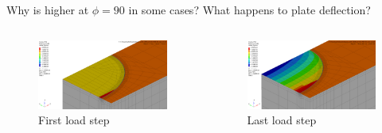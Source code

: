 \begin{frame}
Why is \J higher at \(\phi=90\) in some cases? What happens to plate deflection?
\begin{columns}
\begin{column}{0.45\textwidth}
\begin{figure}[tbp]
\centering
\includegraphics[width=\columnwidth]{step-01-zoomed}
\caption{First load step}
\end{figure}
\end{column}
\begin{column}{0.45\textwidth}
\begin{figure}[tbp]
\centering
\includegraphics[width=\columnwidth]{step-30-zoomed}
\caption{Last load step}
\end{figure}
\end{column}
\end{columns}
\note{
\vfill
}
\end{frame}

